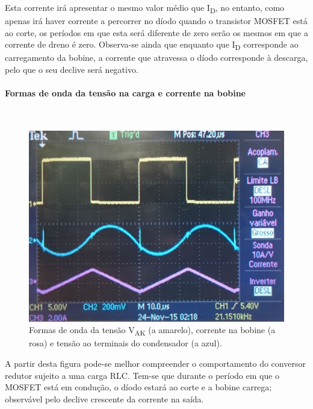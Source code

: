 \documentclass[a4paper,11pt]{article}
\numberwithin{equation}{section}
\begin{document}
Esta corrente irá apresentar o mesmo valor médio que I\textsubscript{D}, no entanto, como apenas irá haver corrente a percorrer no díodo quando o transistor MOSFET está ao corte, os períodos em que esta será diferente de zero serão os mesmos em que a corrente de dreno é zero. Observa-se ainda que enquanto que I\textsubscript{D} corresponde ao carregamento da bobine, a corrente que atravessa o díodo corresponde à descarga, pelo que o seu declive será negativo.

\pagebreak

\paragraph{Formas de onda da tensão na carga e corrente na bobine}\mbox{}\

\begin{figure}[H]
	\centering
	\includegraphics[keepaspectratio=true, scale=0.15]{img/figs/tensao_carga_corrente_bobine_ac_rlcbuck}
	\caption{Formas de onda da tensão V\textsubscript{AK} (a amarelo), corrente na bobine (a rosa) e tensão ao terminais do condensador (a azul).}
	\label{fig:tensao_carga_corrente_bobine_ac_rlcbuck}
	\vspace{-0.8em}
\end{figure} 



A partir desta figura pode-se melhor compreender o comportamento do conversor redutor sujeito a uma carga RLC. Tem-se que durante o período em que o MOSFET está em condução, o díodo estará ao corte e a bobine carrega; observável pelo declive crescente da corrente na saída. 
\end{document}
